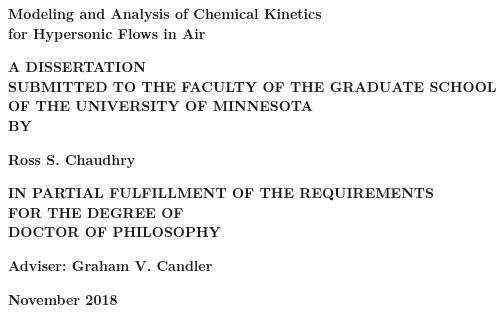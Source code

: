 
\frontmatter




\begin{titlepage}
   \centering
   \vspace*{0.5 cm}

   {\LARGE \bfseries
      Modeling and Analysis of Chemical Kinetics \\[2 pt]         %
      for Hypersonic Flows in Air}
   \vspace{2 cm}

   {\bfseries A DISSERTATION \\
      SUBMITTED TO THE FACULTY OF THE GRADUATE SCHOOL \\
      OF THE UNIVERSITY OF MINNESOTA \\
      BY}
   \vspace{3 cm}

   {\Large\bfseries Ross S. Chaudhry}
   \vspace{3 cm}

   {\bfseries IN PARTIAL FULFILLMENT OF THE REQUIREMENTS \\
      FOR THE DEGREE OF \\
      DOCTOR OF PHILOSOPHY}
   \vspace{2 cm}

   {\bfseries Adviser: Graham V. Candler}
   \vspace{2 cm}

   {\bfseries November 2018}
\end{titlepage}

